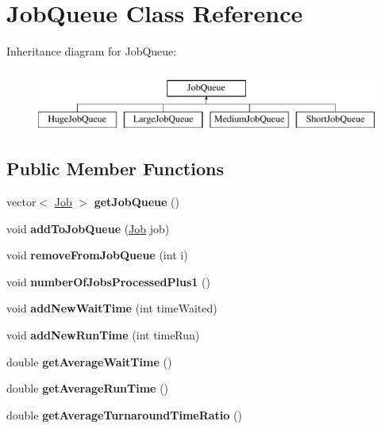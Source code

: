 \hypertarget{class_job_queue}{}\section{Job\+Queue Class Reference}
\label{class_job_queue}
Inheritance diagram for Job\+Queue\+:\begin{figure}[H]
\begin{center}
\leavevmode
\includegraphics[height=2.000000cm]{class_job_queue}
\end{center}
\end{figure}
\subsection*{Public Member Functions}
\begin{DoxyCompactItemize}
\item 
\mbox{\label{class_job_queue_a6d530bf47827ca5b7fd1733908206d9d}} 
vector$<$ \mbox{\hyperlink{class_job}{Job}} $>$ {\bfseries get\+Job\+Queue} ()
\item 
\mbox{\label{class_job_queue_aa21eaa87e05aca2ff536effe4fae1f36}} 
void {\bfseries add\+To\+Job\+Queue} (\mbox{\hyperlink{class_job}{Job}} job)
\item 
\mbox{\label{class_job_queue_a40acca49c00bd568337e5e99cee2c936}} 
void {\bfseries remove\+From\+Job\+Queue} (int i)
\item 
\mbox{\label{class_job_queue_a337fbbcbcd9fdc0d7b4cdf1445540eeb}} 
void {\bfseries number\+Of\+Jobs\+Processed\+Plus1} ()
\item 
\mbox{\label{class_job_queue_a82772a0000d5ad7380950c88c8718d01}} 
void {\bfseries add\+New\+Wait\+Time} (int time\+Waited)
\item 
\mbox{\label{class_job_queue_ad410dafe929327135889e271bd6a2d23}} 
void {\bfseries add\+New\+Run\+Time} (int time\+Run)
\item 
\mbox{\label{class_job_queue_a38e08b929dda86f26a29c2c013905b74}} 
double {\bfseries get\+Average\+Wait\+Time} ()
\item 
\mbox{\label{class_job_queue_a3c386ff5559788ce23ee86dc2b69c93b}} 
double {\bfseries get\+Average\+Run\+Time} ()
\item 
\mbox{\label{class_job_queue_a4965c12a271ee4cb1c9fadfcee2b51d3}} 
double {\bfseries get\+Average\+Turnaround\+Time\+Ratio} ()
\end{DoxyCompactItemize}
